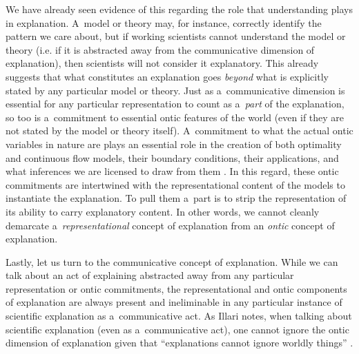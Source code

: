 We have already seen evidence of this regarding the role that understanding plays in explanation. A~model or theory may, for instance, correctly identify the pattern we care about, but if working scientists cannot understand the model or theory (i.e. if it is abstracted away from the communicative dimension of explanation), then scientists will not consider it explanatory. This already suggests that what constitutes an explanation goes \textit{beyond} what is explicitly stated by any particular model or theory. Just as a~communicative dimension is essential for any particular representation to count as a~\textit{part} of the explanation, so too is a~commitment to essential ontic features of the world (even if they are not stated by the model or theory itself). A~commitment to what the actual ontic variables in nature are plays an essential role in the creation of both optimality and continuous flow models, their boundary conditions, their applications, and what inferences we are licensed to draw from them
\parencite[see][]{hochstein_how_2019}. %
 In this regard, these ontic commitments are intertwined with the representational content of the models to instantiate the explanation. To pull them a~part is to strip the representation of its ability to carry explanatory content. In other words, we cannot cleanly demarcate a~\textit{representational} concept of explanation from an \textit{ontic} concept of explanation.

Lastly, let us turn to the communicative concept of explanation. While we can talk about an act of explaining abstracted away from any particular representation or ontic commitments, the representational and ontic components of explanation are always present and ineliminable in any particular instance of scientific explanation as a~communicative act. As Illari notes, when talking about scientific explanation (even as a~communicative act), one cannot ignore the ontic dimension of explanation given that ``explanations cannot ignore worldly things''
\parencite[][p.251]{illari_mechanistic_2013}.%


